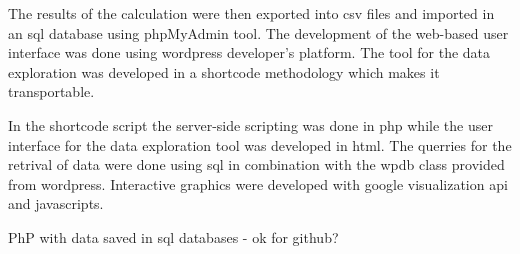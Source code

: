 The results of the calculation were then exported into csv files and imported
in an sql database using phpMyAdmin tool. The development of the web-based user interface was done using wordpress developer's platform. The tool for the data exploration was developed in a shortcode methodology
which makes it transportable.

In the shortcode script the server-side scripting was done in php while the user interface for the data exploration tool was developed in html. The querries for the retrival of data were done using sql in combination with the wpdb class provided from wordpress. Interactive graphics were developed with google visualization api and javascripts.

PhP with data saved in sql databases - ok for github?